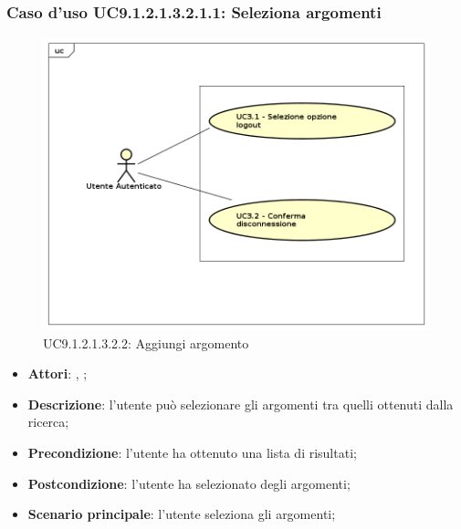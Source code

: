 								\subsubsection{Caso d'uso UC9.1.2.1.3.2.1.1: Seleziona argomenti}
								\label{UC9.1.2.1.3.2.2}
								\begin{figure}[h]
									\centering
									\includegraphics[scale=0.5,keepaspectratio]{UML/UC9.png}
									\caption{UC9.1.2.1.3.2.2: Aggiungi argomento}
								\end{figure}
								\FloatBarrier
								\begin{itemize}
									\item \textbf{Attori}: \uau, \uaupro;
									\item \textbf{Descrizione}: l'utente può selezionare gli argomenti tra quelli ottenuti dalla ricerca;
									\item \textbf{Precondizione}: l'utente ha ottenuto una lista di risultati;
									\item \textbf{Postcondizione}: l'utente ha selezionato degli argomenti; 
									\item \textbf{Scenario principale}: l'utente seleziona gli argomenti;
								\end{itemize}
						
